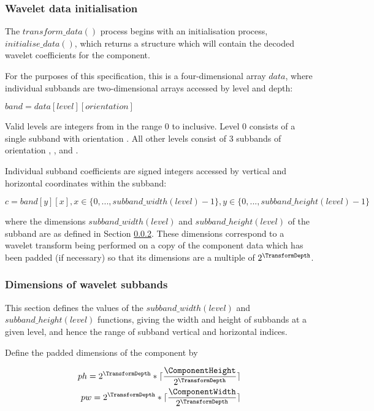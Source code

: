 \label{wltdecodeconventions}

\subsubsection{Wavelet data initialisation}

\label{wltinit}

The $transform\_data()$ process begins with an initialisation process, 
$initialise\_data()$, which returns a structure which will
contain the decoded wavelet coefficients for the component. 

For the purposes of this specification, this is a four-dimensional array $data$,
where individual subbands are two-dimensional arrays accessed by level and depth:

$band = data[level][orientation]$

Valid levels are integers from in the range 0 to \TransformDepth inclusive. 
Level 0 consists of a single subband with orientation \LL. 
All other levels consist of 3 subbands of orientation \LH, \HL, 
and \HH.

Individual subband coefficients are signed integers accessed by vertical and 
horizontal coordinates within the subband:

$c = band[y][x], x\in\{0, ... , subband\_width(level)-1\}, 
y\in\{0, ... , subband\_height(level)-1\}$

where the dimensions $subband\_width(level)$ and $subband\_height(level)$ of the subband
are as defined in Section 
\ref{subbandwidthheight}. These dimensions correspond to a wavelet transform
being performed on a copy of the component data which has been padded (if necessary) so that its
dimensions are a multiple of $2^{\TransformDepth}$.


\subsubsection{Dimensions of wavelet subbands}
\label{subbandwidthheight}

This section defines the values of the $subband\_width(level)$ and $subband\_height(level)$
functions, giving the width and height of subbands at a given level, and hence the range
of subband vertical and horizontal indices. 

Define the padded dimensions of the component by

\begin{eqnarray*}
ph = 2^{\TransformDepth}*\lceil\frac{\ComponentHeight}{2^{\TransformDepth}}\rceil \\
pw = 2^{\TransformDepth}*\lceil\frac{\ComponentWidth}{2^{\TransformDepth}}\rceil
\end{eqnarray*}

